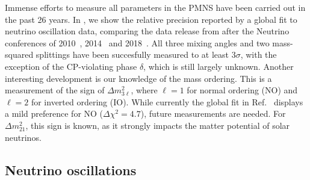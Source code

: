 Immense efforts to measure all parameters in the PMNS have been carried out in the past 26 years. In , we show the relative precision reported by a global fit to neutrino oscillation data, comparing the data release from after the Neutrino conferences of 2010~\cite{Schwetz:2011qt}, 2014~\cite{Gonzalez-Garcia:2014bfa} and 2018~\cite{Esteban:2018azc}. All three mixing angles and two mass-squared splittings have been succesfully measured to at least $3\sigma$, with the exception of the CP-violating phase $\delta$, which is still largely unknown. Another interesting development is our knowledge of the mass ordering. This is a measurement of the sign of $\Delta m^2_{3\ell}$, where $\ell = 1$ for normal ordering (NO) and $\ell = 2$ for inverted ordering (IO). While currently the global fit in Ref.~\cite{Esteban:2018azc} displays a mild preference for NO ($\Delta \chi^2 = 4.7$), future measurements are needed. For $\Delta m^2_{21}$, this sign is known, as it strongly impacts the matter potential of solar neutrinos.


\subsection{Neutrino oscillations}

